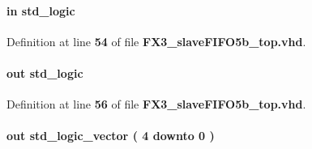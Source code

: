\paragraph[{ext\+\_\+buff\+\_\+rdy}]{ {\bfseries \textcolor{keywordflow}{in}\textcolor{vhdlchar}{ }} {\bfseries \textcolor{comment}{std\+\_\+logic}\textcolor{vhdlchar}{ }} \hspace{0.3cm}{\ttfamily [Port]}}\label{classFX3__slaveFIFO5b__top_a718281bc42ddc25b4cca81dcfb24ddd7}


Definition at line {\bf 54} of file {\bf F\+X3\+\_\+slave\+F\+I\+F\+O5b\+\_\+top.\+vhd}.

\paragraph[{ext\+\_\+buff\+\_\+wr}]{ {\bfseries \textcolor{keywordflow}{out}\textcolor{vhdlchar}{ }} {\bfseries \textcolor{comment}{std\+\_\+logic}\textcolor{vhdlchar}{ }} \hspace{0.3cm}{\ttfamily [Port]}}\label{classFX3__slaveFIFO5b__top_afa009626e45be5bfdae79767b4120f3c}


Definition at line {\bf 56} of file {\bf F\+X3\+\_\+slave\+F\+I\+F\+O5b\+\_\+top.\+vhd}.

\paragraph[{faddr}]{ {\bfseries \textcolor{keywordflow}{out}\textcolor{vhdlchar}{ }} {\bfseries \textcolor{comment}{std\+\_\+logic\+\_\+vector}\textcolor{vhdlchar}{ }\textcolor{vhdlchar}{(}\textcolor{vhdlchar}{ }\textcolor{vhdlchar}{ } \textcolor{vhdldigit}{4} \textcolor{vhdlchar}{ }\textcolor{keywordflow}{downto}\textcolor{vhdlchar}{ }\textcolor{vhdlchar}{ } \textcolor{vhdldigit}{0} \textcolor{vhdlchar}{ }\textcolor{vhdlchar}{)}\textcolor{vhdlchar}{ }} \hspace{0.3cm}{\ttfamily [Port]}}\label{classFX3__slaveFIFO5b__top_a0c50f62a635302d432462206ac4b7383}


